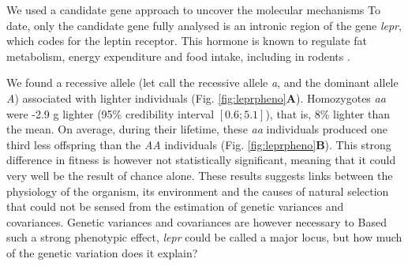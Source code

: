 We used a candidate gene approach to uncover the molecular mechanisms 
To date, only the candidate gene fully analysed is an intronic region of the gene \emph{lepr}, which codes for the leptin receptor. This hormone is known to regulate fat metabolism, energy expenditure and food intake, including in rodents \parencite{Houseknecht1998}.

We found a recessive allele (let call the recessive allele \emph{a}, and the dominant allele \emph{A}) associated with lighter individuals (Fig. \ref{fig:leprpheno}\textbf{A}). Homozygotes \emph{aa} were -2.9 g lighter (95\% credibility interval $[0.6;5.1]$), that is, 8\% lighter than the mean. On average, during their lifetime, these \emph{aa} individuals produced one third less offspring than the \emph{AA} individuals (Fig. \ref{fig:leprpheno}\textbf{B}). This strong difference in fitness is however not statistically significant, meaning that it could very well be the result of chance alone. These results suggests links between the physiology of the organism, its environment and the causes of natural selection that could not be sensed from the estimation of genetic variances and covariances. 
Genetic variances and covariances are however necessary to 
Based such a strong phenotypic effect, \emph{lepr} could be called a major locus, but how much of the genetic variation does it explain?

